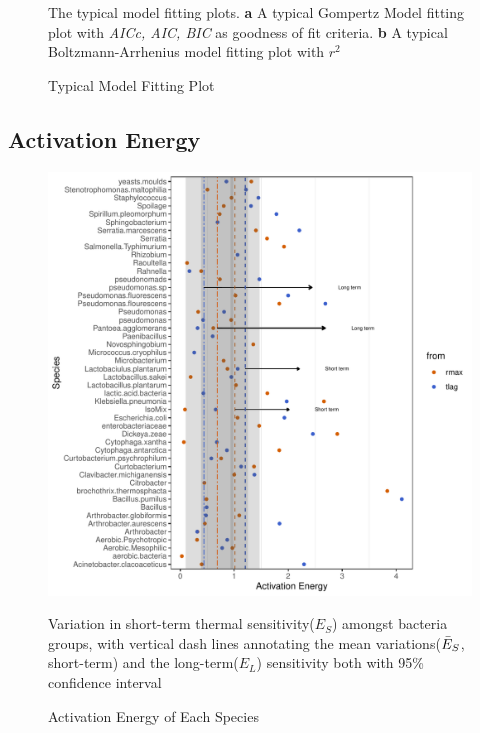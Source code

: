 \begin{figure}[ht!]
\caption{Typical Model Fitting Plot}\label{fig:typ_fit}
{\footnotesize The typical model fitting plots. \textbf{a} A typical Gompertz Model fitting plot with \textit{AICc, AIC, BIC} as goodness of fit criteria. \textbf{b} A typical Boltzmann-Arrhenius model fitting plot with \textit{$r^2$}}
\end{figure}

\subsection{Activation Energy}

\begin{figure}[ht!]
\centering
\includegraphics[width=1\linewidth]{Plot/E_spe.pdf}
\caption{Activation Energy of Each Species}\label{fig:E_Spe}
{\footnotesize Variation in short-term thermal sensitivity($E_S$) amongst bacteria groups, with vertical dash lines annotating the mean variations($\Bar{E}_S$, short-term) and the long-term($E_L$) sensitivity both with 95\% confidence interval}
\end{figure}

\begin{center}

\end{center}
\begin{center}

\end{center}

